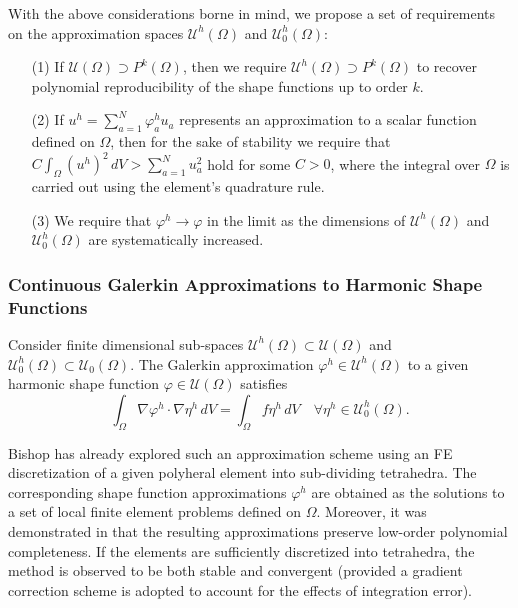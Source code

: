 	With the above considerations borne in mind, we propose a set of requirements on the approximation spaces $\mathcal{U}^h (\Omega)$ and $\mathcal{U}^h_0 (\Omega)$:
	\begin{itemize}
		\item[(1)] If $\mathcal{U} (\Omega) \supset P^{k} (\Omega)$, then we require $\mathcal{U}^h (\Omega) \supset P^{k} (\Omega)$ to recover polynomial reproducibility of the shape functions up to order $k$.
		\item[(2)] If $u^h = \sum_{a=1}^N \varphi^h_a u_a$ represents an approximation to a scalar function defined on $\Omega$, then for the sake of stability we require that $C \int_{\Omega} (u^h)^2 \, dV > \sum_{a=1}^N u^2_a$ hold for some $C > 0$, where the integral over $\Omega$ is carried out using the element's quadrature rule.
		\item[(3)] We require that $\varphi^h \rightarrow \varphi$ in the limit as the dimensions of $\mathcal{U}^h (\Omega)$ and $\mathcal{U}^h_0 (\Omega)$ are systematically increased.
	\end{itemize}
	
\subsubsection*{Continuous Galerkin Approximations to Harmonic Shape Functions}

	Consider finite dimensional sub-spaces $\mathcal{U}^h (\Omega) \subset \mathcal{U} (\Omega)$ and $\mathcal{U}^h_0 (\Omega) \subset \mathcal{U}_0 (\Omega)$. The Galerkin approximation $\varphi^h \in \mathcal{U}^h (\Omega)$ to a given harmonic shape function $\varphi \in \mathcal{U} (\Omega)$ satisfies
	\begin{equation}
		\int_\Omega \nabla \varphi^h \cdot \nabla \eta^h \, dV = \int_\Omega f \eta^h \, dV \quad \forall \eta^h \in \mathcal{U}^h_0 (\Omega).
		\label{eq:weak_poisson}
	\end{equation}
	
	Bishop has already explored such an approximation scheme using an FE discretization of a given polyheral element into sub-dividing tetrahedra. The corresponding shape function approximations $\varphi^h$ are obtained as the solutions to a set of local finite element problems defined on $\Omega$. Moreover, it was demonstrated in \cite{Bishop:14} that the resulting approximations preserve low-order polynomial completeness. If the elements are sufficiently discretized into tetrahedra, the method is observed to be both stable and convergent (provided a gradient correction scheme is adopted to account for the effects of integration error).
	
